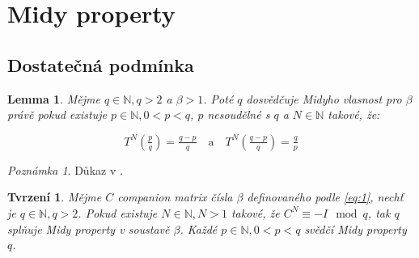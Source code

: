 \documentclass{article}
\newtheorem{theorem}{Tvrzení}
\newtheorem{lemma}[veta]{Lemma}
\theoremstyle{definition}
\theoremstyle{definition}
\theoremstyle{remark}
\newtheorem*{pozn}{Poznámka}
\numberwithin{equation}{section}
\begin{document}
\section{Midy property}
\subsection{Dostatečná podmínka}

\begin{lemma}\label{Necessary}
	Mějme $q \in \mathbb{N}, q > 2$ a $\beta > 1$. Poté $q$ dosvědčuje Midyho vlasnost pro $\beta$ právě pokud existuje $p \in \mathbb{N}, 0 < p < q$, $p$ nesoudělné s $q$ a $N \in \mathbb{N}$ takové, že:

	\begin{equation*}
		T^N(\tfrac{p}{q}) = \tfrac{q - p}{q} \quad \mathrm{a} \quad T^N(\tfrac{q - p}{q}) = \tfrac{q}{p}
	\end{equation*}
\end{lemma}

\begin{pozn}
	Důkaz v \cite{Midy}.
\end{pozn}

\begin{theorem}
	Mějme $C$ \textit{companion matrix} čísla $\beta$ definovaného podle \eqref{eq:1}, nechť je $q \in \mathbb{N}, q > 2$. Pokud existuje $N \in \mathbb{N}, N > 1$ takové, že $C^N \equiv -I \mod q$, tak $q$ splňuje \textit{Midy property} v soustavě $\beta$. Každé $p \in \mathbb{N}, 0 < p < q$ \textit{svědčí} \textit{Midy property} $q$.
\end{theorem}
\end{document}
